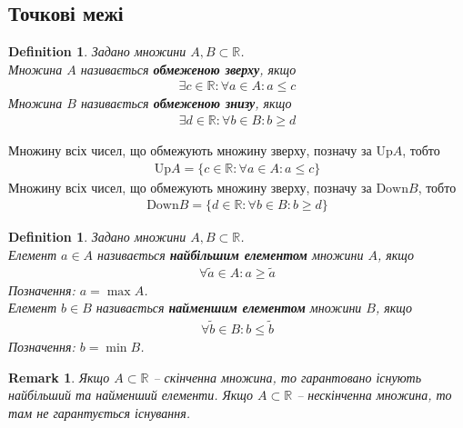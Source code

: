 \documentclass[a4paper, 14pt]{article}
\theoremstyle{theoremdd}
\theoremstyle{theoremdd}
\newtheorem{definition}[theorem]{Definition}
\theoremstyle{theoremdd}
\theoremstyle{theoremdd}
\theoremstyle{theoremdd}
\theoremstyle{theoremdd}
\newtheorem{remark}[theorem]{Remark}
\theoremstyle{theoremdd}
\theoremstyle{theoremdd}
\begin{document}
	\subsection{Точкові межі}
\begin{definition}
Задано множини $A,B \subset \mathbb{R}$.\\
	Множина $A$ називається \textbf{обмеженою зверху}, якщо
	\begin{align*}
	\exists c \in \mathbb{R}: \forall a \in A: a \leq c
	\end{align*}
	Множина $B$ називається \textbf{обмеженою знизу}, якщо
	\begin{align*}
	\exists d \in \mathbb{R}: \forall b \in B: b \geq d
	\end{align*}
\end{definition}
	Множину всіх чисел, що обмежують множину зверху, позначу за $\text{Up}A$, тобто
	\begin{align*}
	\text{Up}A = \{c \in \mathbb{R}: \forall a \in A: a \leq c \}
	\end{align*}
	Множину всіх чисел, що обмежують множину зверху, позначу за $\text{Down}B$, тобто
	\begin{align*}
	\text{Down}B = \{d \in \mathbb{R}: \forall b \in B: b \geq d \}
	\end{align*}
	
	\begin{definition}
	Задано множини $A,B \subset \mathbb{R}$.\\
	Елемент $a \in A$ називається \textbf{найбільшим елементом} множини $A$, якщо
	\begin{align*}
	\forall \tilde{a} \in A: a \geq \tilde{a}
	\end{align*}
	Позначення: $a = \max A$.\\
	Елемент $b \in B$ називається \textbf{найменшим елементом} множини $B$, якщо
	\begin{align*}
	\forall \tilde{b} \in B: b \leq \tilde{b}
	\end{align*}
	Позначення: $b = \min B$.
	\end{definition}
	
	\begin{remark}
	Якщо $A \subset \mathbb{R}$ -- скінченна множина, то гарантовано існують найбільший та найменший елементи. Якщо $A \subset \mathbb{R}$ -- нескінченна множина, то там не гарантується існування.
	\end{remark}
	
\end{document}
